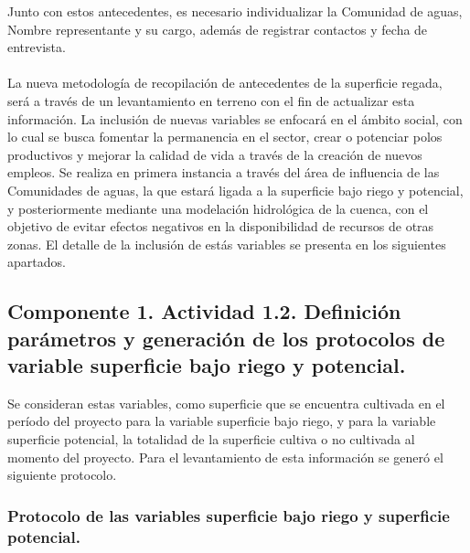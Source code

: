 \documentclass[]{article}
\begin{document}
Junto con estos antecedentes, es necesario individualizar la Comunidad de aguas, Nombre representante y su cargo, además de registrar contactos y fecha de entrevista.\\
\\


La nueva metodología de recopilación de antecedentes de la superficie regada, será a través de un levantamiento en terreno con el fin de actualizar esta información. La inclusión de nuevas variables se enfocará en el ámbito social, con lo cual se busca fomentar la permanencia en el sector, crear o potenciar polos productivos y mejorar la calidad de vida a través de la creación de nuevos empleos. Se realiza en primera instancia a través del área de influencia de las Comunidades de aguas, la que estará ligada a la superficie bajo riego y potencial, y posteriormente mediante una modelación hidrológica de la cuenca, con el objetivo de evitar efectos negativos en la disponibilidad de recursos de otras zonas. El detalle de la inclusión de estás variables se presenta en los siguientes apartados.\\

\subsection{Componente 1. Actividad 1.2. Definición parámetros y generación de los protocolos de variable superficie bajo riego y potencial.}

Se consideran estas variables, como superficie que se encuentra cultivada en el período del proyecto para la variable superficie bajo riego, y para la variable superficie potencial, la totalidad de la superficie cultiva o no cultivada al momento del proyecto. Para el levantamiento de esta información se generó el siguiente protocolo.

\subsubsection{Protocolo de las variables superficie bajo riego y superficie potencial.}
\end{document}
